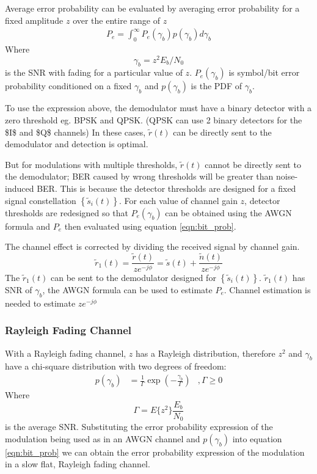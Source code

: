 Average error probability can be evaluated by averaging error probability for a fixed amplitude $z$ over the entire range of $z$
\begin{align}
P_e = \int_0^\infty P_e(\gamma_b)p(\gamma_b)d\gamma_b
\label{eqn:bit_prob}
\end{align}
Where
$$\gamma_b = z^2E_b/N_0$$
is the \gls{SNR} with fading for a particular value of $z$. $P_e(\gamma_b)$ is symbol/bit error probability conditioned on a fixed $\gamma_b$ and $p(\gamma_b)$ is the \gls{PDF} of $\gamma_b$.

To use the expression above, the demodulator must have a binary detector with a zero threshold eg. B\gls{PSK} and Q\gls{PSK}. (Q\gls{PSK} can use 2 binary detectors for the \gls{$I$} and \gls{$Q$} channels) In these cases, $\tilde{r}(t)$ can be directly sent to the demodulator and detection is optimal.

But for modulations with multiple thresholds, $\tilde{r}(t)$ cannot be directly sent to the demodulator; \gls{BER} caused by wrong thresholds will be greater than noise-induced \gls{BER}. This is because the detector thresholds are designed for a fixed signal constellation $\left\{\tilde{s}_i(t)\right\}$. For each value of channel gain $z$, detector thresholds are redesigned so that $P_e(\gamma_b)$ can be obtained using the \gls{AWGN} formula and $P_e$ then evaluated using equation \ref{eqn:bit_prob}.

The channel effect is corrected by dividing the received signal by channel gain.
$$\tilde{r}_1(t) = \frac{\tilde{r}(t)}{ze^{-j\phi}} = \tilde{s}(t) + \frac{\tilde{n}(t)}{ze^{-j\phi}}$$
The $\tilde{r}_1(t)$ can be sent to the demodulator designed for $\left\{\tilde{s}_i(t)\right\}$. $\tilde{r}_1(t)$ has \gls{SNR} of $\gamma_b$, the \gls{AWGN} formula can be used to estimate $P_e$. Channel estimation is needed to estimate $ze^{-j\phi}$

\subsubsection{Rayleigh Fading Channel}
With a Rayleigh fading channel, $z$ has a Rayleigh distribution, therefore $z^2$ and $\gamma_b$ have a chi-square distribution with two degrees of freedom:
\begin{align}
p(\gamma_b) &= \frac{1}{\Gamma}\exp \left( -\frac{\gamma_b}{\Gamma}\right) &, \Gamma \geq 0
\label{eqn:ray_pdf}
\end{align}
Where
$$\Gamma = E\{z^2\}\frac{E_b}{N_0}$$
is the average \gls{SNR}.
Substituting the error probability expression of the modulation being used as in an \gls{AWGN} channel and $p(\gamma_b)$ into equation \ref{eqn:bit_prob} we can obtain the error probability expression of the modulation in a slow flat, Rayleigh fading channel.

